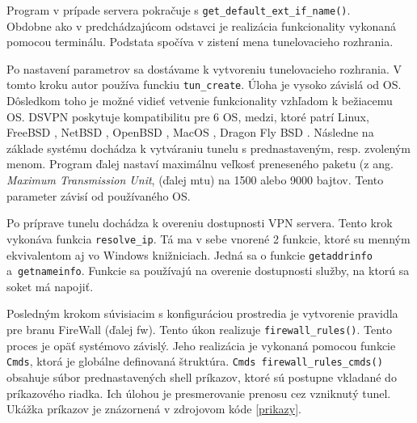 Program v prípade servera pokračuje s \lstinline|get_default_ext_if_name()|. \\Obdobne ako v predchádzajúcom odstavci je realizácia funkcionality vykonaná pomocou terminálu. Podstata spočíva v zistení mena tunelovacieho rozhrania.
 
Po nastavení parametrov sa dostávame k vytvoreniu tunelovacieho rozhrania. V tomto kroku autor používa funckiu \lstinline|tun_create|. Úloha je vysoko závislá od OS. Dôsledkom toho je možné vidieť vetvenie funkcionality vzhľadom k bežiacemu OS. DSVPN poskytuje kompatibilitu pre 6 OS, medzi, ktoré patrí Linux, FreeBSD \cite{fbsd}, NetBSD \cite{netbsd}, OpenBSD \cite{obsd}, MacOS \cite{mac}, Dragon Fly BSD \cite{dfbsd}. Následne na základe systému dochádza k vytváraniu tunelu s prednastaveným, resp. zvoleným menom. Program ďalej nastaví maximálnu veľkosť preneseného paketu (z ang. \textit{Maximum Transmission Unit}, (ďalej \acrshort{mtu}) na 1500 alebo 9000 bajtov. Tento parameter závisí od používaného OS.  
 
Po príprave tunelu dochádza k overeniu dostupnosti VPN servera. Tento krok vykonáva funkcia \lstinline|resolve_ip|. Tá ma v sebe vnorené 2 funkcie, ktoré su menným ekvivalentom aj vo Windows knižniciach. Jedná sa o funkcie \lstinline|getaddrinfo| \\a~\lstinline|getnameinfo|. Funkcie sa používajú na overenie dostupnosti služby, na ktorú sa soket má napojiť. 
 
Posledným krokom súvisiacim s konfiguráciou prostredia je vytvorenie pravidla pre branu FireWall (ďalej \acrshort{fw}). Tento úkon realizuje \lstinline|firewall_rules()|. Tento proces je opäť systémovo závislý. Jeho realizácia je vykonaná pomocou funkcie \lstinline|Cmds|, ktorá je globálne definovaná štruktúra. \lstinline|Cmds firewall_rules_cmds()| obsahuje súbor prednastavených shell príkazov, ktoré sú postupne vkladané do príkazového riadka. Ich úlohou je presmerovanie prenosu cez vzniknutý tunel. Ukážka príkazov je znázornená v zdrojovom kóde \ref{prikazy}. 

